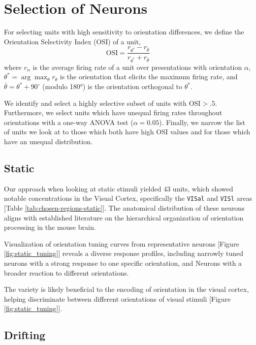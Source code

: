 \documentclass[10pt,twocolumn]{article}
\begin{document}
\section{Selection of Neurons}

For selecting units with high sensitivity to orientation differences, we define the Orientation Selectivity Index (OSI) of a unit,
\[\textrm{OSI} = \frac{r_{\theta^*} - r_{\bar\theta}}{r_{\theta^*} + r_{\bar\theta}}\]
where $r_\alpha$ is the average firing rate of a unit over presentations with orientation $\alpha$, $\theta^* = \arg\max_\theta r_\theta$ is the orientation that elicits the maximum firing rate, and $\bar{\theta} = \theta^* + 90^\circ$ (modulo 180°) is the orientation orthogonal to $\theta^*$.

We identify and select a highly selective subset of units with \(\textrm{OSI} > .5\).  Furthermore, we select units which have unequal firing rates throughout orientations with a one-way ANOVA test (\(\alpha = 0.05\)).  Finally, we narrow the list of units we look at to those which both have high OSI values and for those which have an unequal distribution.

\subsection{Static}

Our approach when looking at static stimuli yielded 43 units, which showed notable concentrations in the Visual Cortex, specifically the \texttt{VISal} and \texttt{VISl} areas [Table \ref{tab:chosen-regions-static}].  The anatomical distribution of these neurons aligns with established literature on the hierarchical organization of orientation processing in the mouse brain.

Visualization of orientation tuning curves from representative neurons [Figure \ref{fig:static_tuning}] reveals a diverse response profiles, including narrowly tuned neurons with a strong response to one specific orientation, and Neurons with a broader reaction to different orientations.

The variety is likely beneficial to the encoding of orientation in the visual cortex, helping discriminate between different orientations of visual stimuli [Figure \ref{fig:static_tuning}].

\subsection{Drifting}
\end{document}
